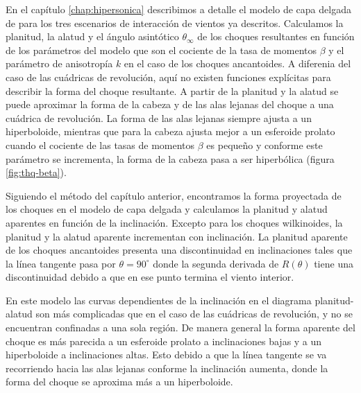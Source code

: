 En el capítulo \ref{chap:hipersonica} describimos a detalle el modelo de capa delgada de \CRW{} para los tres escenarios de interacción de vientos ya descritos. Calculamos la planitud, la alatud y el ángulo asintótico $\theta_\infty$ de los choques resultantes en función de los parámetros del modelo que son el cociente de la tasa de momentos $\beta$ y el parámetro de anisotropía $k$ en el caso de los choques ancantoides. A diferenia del caso de las cuádricas de revolución, aquí no existen funciones explícitas para describir la forma del choque resultante. A partir de la planitud y la alatud se puede aproximar la forma de la cabeza y de las alas lejanas del choque a una cuádrica de revolución. La forma de las alas lejanas siempre ajusta a un hiperboloide, mientras que para la cabeza ajusta mejor a un esferoide prolato cuando el cociente de las tasas de momentos $\beta$ es pequeño y conforme este parámetro se incrementa, la forma de la cabeza pasa a ser hiperbólica (figura \ref{fig:thq-beta}).

Siguiendo el método del capítulo anterior, encontramos la forma proyectada de los choques en el modelo de capa delgada y calculamos la planitud y alatud aparentes en función de la inclinación. Excepto para los choques wilkinoides, la planitud y la alatud aparente incrementan con inclinación. La planitud aparente de los choques ancantoides presenta una discontinuidad en inclinaciones tales que la línea tangente pasa por $\theta=90^\circ$ donde la segunda derivada de $R(\theta)$ tiene una discontinuidad debido a que en ese punto termina el viento interior.

En este modelo las curvas dependientes de la inclinación en el diagrama planitud-alatud son más complicadas que en el caso de las cuádricas de revolución, y no se encuentran confinadas a una sola región. De manera general la forma aparente del choque es más parecida a un esferoide prolato a inclinaciones bajas y a un hiperboloide a inclinaciones altas. Esto debido a que la línea tangente se va recorriendo hacia las alas lejanas conforme la inclinación aumenta, donde la forma del choque se aproxima más a un hiperboloide.

